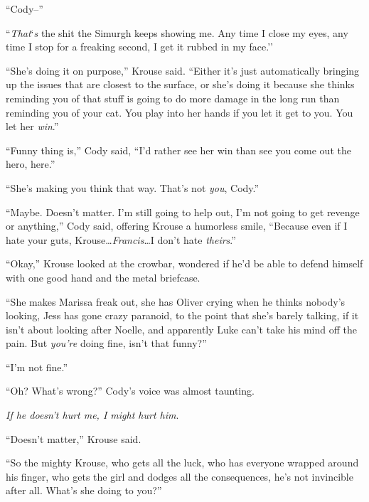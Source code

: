 ``Cody--''



``\emph{That}`\emph{s} the shit the Simurgh keeps showing me.  Any time I close my eyes, any time I stop for a freaking second, I get it rubbed in my face.''



``She's doing it on purpose,'' Krouse said.  ``Either it's just automatically bringing up the issues that are closest to the surface, or she's doing it because she thinks reminding you of that stuff is going to do more damage in the long run than reminding you of your cat.  You play into her hands if you let it get to you.  You let her \emph{win}.''



``Funny thing is,'' Cody said, ``I'd rather see her win than see you come out the hero, here.''



``She's making you think that way.  That's not \emph{you}, Cody.''



``Maybe.  Doesn't matter.  I'm still going to help out, I'm not going to get revenge or anything,'' Cody said, offering Krouse a humorless smile, ``Because even if I hate your guts, Krouse\ldots  \emph{Francis}\ldots I don't hate \emph{theirs}.''



``Okay,'' Krouse looked at the crowbar, wondered if he'd be able to defend himself with one good hand and the metal briefcase.



``She makes Marissa freak out, she has Oliver crying when he thinks nobody's looking, Jess has gone crazy paranoid, to the point that she's barely talking, if it isn't about looking after Noelle, and apparently Luke can't take his mind off the pain.  But \emph{you're} doing fine, isn't that funny?''



``I'm not fine.''



``Oh?  What's wrong?''  Cody's voice was almost taunting.



\emph{If he doesn't hurt me, I might hurt him}.



``Doesn't matter,'' Krouse said.



``So the mighty Krouse, who gets all the luck, who has everyone wrapped around his finger, who gets the girl and dodges all the consequences, he's not invincible after all.  What's she doing to you?''




